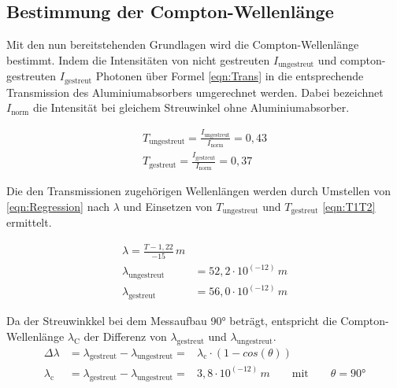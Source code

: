 \documentclass[titlepage = firstcover]{scrartcl}
\begin{document}
        \subsection{Bestimmung der Compton-Wellenlänge}
        Mit den nun bereitstehenden Grundlagen wird die Compton-Wellenlänge bestimmt. Indem die Intensitäten von nicht gestreuten $I_{\text{ungestreut}}$ 
        und compton-gestreuten $I_{\text{gestreut}}$ Photonen über Formel \ref{eqn:Trans} in die entsprechende Transmission des Aluminiumabsorbers umgerechnet
        werden. Dabei bezeichnet $I_{\text{norm}}$ die Intensität bei gleichem Streuwinkel ohne Aluminiumabsorber. 
        
        \begin{align}
            T_{\text{ungestreut}} = \frac{I_{\text{ungestreut}}}{I_{\text{norm}}}=0,43\\
            T_{\text{gestreut}} = \frac{I_{\text{gestreut}}}{I_{\text{norm}}}=0,37
            \label{eqn:T1T2}
        \end{align}

        Die den Transmissionen zugehörigen Wellenlängen werden durch Umstellen von \ref{eqn:Regression} nach $\lambda$ und Einsetzen von $T_{\text{ungestreut}}$
        und $T_{\text{gestreut}}$ \ref{eqn:T1T2} ermittelt.

        \begin{align}
            \lambda = \frac{T - 1,22}{-15} \, m \\
            \lambda_{\text{ungestreut}} &= 52,2 \cdot 10^{\left(-12\right)} \, m \\
            \lambda_{\text{gestreut}} &= 56,0 \cdot 10^{\left(-12\right)} \, m
            \label{eqn:y1,y2}
        \end{align}

        Da der Streuwinkkel bei dem Messaufbau 90° beträgt, entspricht die Compton-Wellenlänge $\lambda_{\text{C}}$ der Differenz von $\lambda_{\text{gestreut}}$
        und $\lambda_{\text{ungestreut}}$.
        \begin{align}
            \Delta \lambda &= \lambda_{\text{gestreut}} - \lambda_{\text{ungestreut}} =& \lambda_{\text{c}} \cdot \left(1 -cos (\theta)\right)\\
            \lambda_{\text{c}} &= \lambda_{\text{gestreut}} - \lambda_{\text{ungestreut}} =& 3,8 \cdot 10^{\left(-12\right)} \, m \qquad \text{mit} \qquad \theta=90°
            \label{eqn:ycexp}
        \end{align} 
\end{document}
